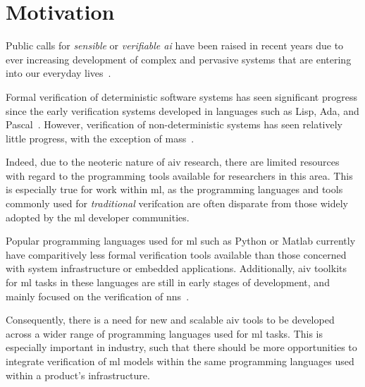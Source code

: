 
\section{Motivation}

Public calls for \textit{sensible} or \textit{verifiable \Gls{ai}} have been raised in recent years due to ever increasing
development of complex and pervasive systems that are entering into our everyday lives~\citep{russell2016}.


Formal verification of deterministic software systems has seen significant progress since the early
verification systems developed in languages such as Lisp, Ada, and Pascal~\citep{polak1979, boyer1990, guaspari1993}. However,
verification of non-deterministic systems has seen relatively little progress, with the exception of
\Glspl{mas}~\citep{lomuscio2017, kouvaros2016}.


Indeed, due to the neoteric nature of \gls{aiv} research, there are limited resources with regard to the 
programming tools available for researchers in this area. This is especially true for work
within \gls{ml}, as the programming languages and tools commonly used for \textit{traditional} verifcation are often
disparate from those widely adopted by the \gls{ml} developer communities.

Popular programming languages used for \gls{ml} such as Python or Matlab currently have comparitively less
formal verification tools available than those concerned with system infrastructure or embedded applications.
Additionally, \gls{aiv} toolkits for \gls{ml} tasks in these languages are still in early stages of development, and mainly focused
on the verification of \glspl{nn}~\citep{kokke2020}. 

Consequently, there is a need for new and scalable
\gls{aiv} tools to be developed across a wider range of programming languages used for \gls{ml} tasks. 
This is especially important in industry, such that there should be more opportunities to
integrate verification of \gls{ml} models within the same programming languages used within
a product's infrastructure.


